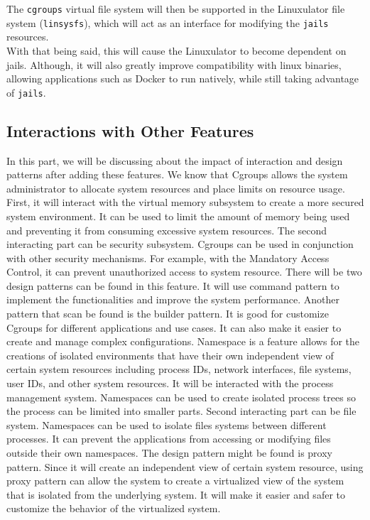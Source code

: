 \documentclass[12pt, dvipsnames, a4paper]{article}
\begin{document}
The \texttt{cgroups} virtual file system will then be supported in the
Linuxulator file system (\texttt{linsysfs}), which will act as an interface
for modifying the \texttt{jails} resources.\\

With that being said, this will cause the Linuxulator to become dependent on
jails. Although, it will also greatly improve compatibility with linux
binaries, allowing applications such as Docker to run natively, while still
taking advantage of \texttt{jails}.

\subsection{Interactions with Other Features}
In this part, we will be discussing about the impact of interaction and design patterns after
adding these features. We know that Cgroups allows the system administrator to allocate
system resources and place limits on resource usage. First, it will interact with the virtual
memory subsystem to create a more secured system environment. It can be used to limit the
amount of memory being used and preventing it from consuming excessive system resources.
The second interacting part can be security subsystem. Cgroups can be used in conjunction with
other security mechanisms. For example, with the Mandatory Access Control, it can prevent
unauthorized access to system resource. There will be two design patterns can be found in this
feature. It will use command pattern to implement the functionalities and improve the system
performance. Another pattern that scan be found is the builder pattern. It is good for customize
Cgroups for different applications and use cases. It can also make it easier to create and
manage complex configurations.
Namespace is a feature allows for the creations of isolated environments that have their own
independent view of certain system resources including process IDs, network interfaces, file
systems, user IDs, and other system resources. It will be interacted with the process
management system. Namespaces can be used to create isolated process trees so the process
can be limited into smaller parts. Second interacting part can be file system. Namespaces can
be used to isolate files systems between different processes. It can prevent the applications
from accessing or modifying files outside their own namespaces. The design pattern might be
found is proxy pattern. Since it will create an independent view of certain system resource,
using proxy pattern can allow the system to create a virtualized view of the system that is
isolated from the underlying system. It will make it easier and safer to customize the behavior
of the virtualized system.
\clearpage
\end{document}
